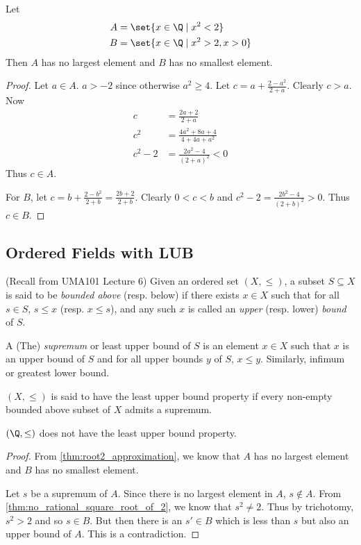\begin{theorem} \label{thm:root2_approximation}
    Let \begin{align*}
        A &= \set{x \in \Q \mid x^2 < 2} \\
        B &= \set{x \in \Q \mid x^2 > 2, x > 0}
    \end{align*}
    Then $A$ has no largest element and $B$ has no smallest element.
\end{theorem}
\begin{proof}
    Let $a \in A$.
    $a > -2$ since otherwise $a^2 \ge 4$.
    Let $c = a + \frac{2 - a^2}{2 + a}$.
    Clearly $c > a$.
    Now \begin{align*}
        c      &= \frac{2a + 2}{2 + a} \\
        c^2     &= \frac{4a^2 + 8a + 4}{4 + 4a + a^2} \\
        c^2 - 2 &= \frac{2a^2 - 4}{(2 + a)^2} < 0
    \end{align*}
    Thus $c \in A$.

    For $B$, let $c = b + \frac{2 - b^2}{2 + b} = \frac{2b + 2}{2 + b}$.
    Clearly $0 < c < b$ and $c^2 - 2 = \frac{2b^2 - 4}{(2 + b)^2} > 0$.
    Thus $c \in B$.
\end{proof}

\subsection{Ordered Fields with LUB} \label{sec:ordered_fields_with_lub}
(Recall from UMA101 Lecture 6)
Given an ordered set $(X, \le)$, a subset $S \subseteq X$ is said to be
\emph{bounded above} (resp. below) if there exists $x \in X$ such that for all
$s \in S$, $s \le x$ (resp. $x \le s$), and any such $x$ is called an
\emph{upper} (resp. lower) \emph{bound} of $S$.

A (The) \emph{supremum} or least upper bound of $S$ is an element $x \in X$
such that $x$ is an upper bound of $S$ and for all upper bounds $y$ of $S$,
$x \le y$.
Similarly, infimum or greatest lower bound.

$(X, \le)$ is said to have the least upper bound property if every non-empty
bounded above subset of $X$ admits a supremum.

\begin{proposition}
    $(\Q, \le)$ does not have the least upper bound property.
\end{proposition}
\begin{proof}
    From \cref{thm:root2_approximation}, we know that $A$ has no largest element
    and $B$ has no smallest element.

    Let $s$ be a supremum of $A$.
    Since there is no largest element in $A$, $s \notin A$.
    From \cref{thm:no_rational_square_root_of_2}, we know that $s^2 \ne 2$.
    Thus by trichotomy, $s^2 > 2$ and so $s \in B$.
    But then there is an $s' \in B$ which is less than $s$ but also an upper
    bound of $A$.
    This is a contradiction.
\end{proof}


